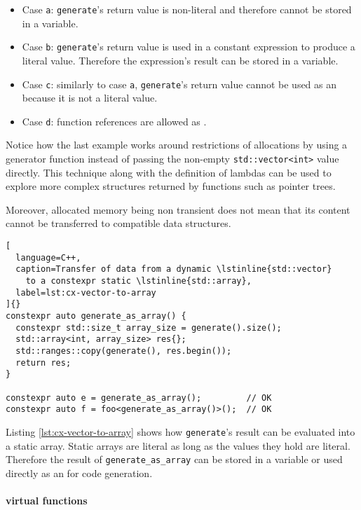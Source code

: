 \documentclass[../main]{subfiles}
\begin{document}
\begin{itemize}
\item Case \lstinline{a}: \lstinline{generate}'s return value is non-literal
      and therefore cannot be stored in a \constexpr variable.
\item Case \lstinline{b}: \lstinline{generate}'s return value is used in a
      constant expression to produce a literal value.
      Therefore the expression's result can be stored in a \constexpr variable.
\item Case \lstinline{c}: similarly to case \lstinline{a},
      \lstinline{generate}'s return value cannot be used as an \nttp because it
      is not a literal value.
\item Case \lstinline{d}: function references are allowed as \nttps.
\end{itemize}

Notice how the last example works around restrictions of \constexpr allocations
by using a generator function instead of passing the non-empty
\lstinline{std::vector<int>} value directly. This technique along with the
definition of lambdas can be used to explore more complex structures returned by
\constexpr functions such as pointer trees.

Moreover, \constexpr allocated memory being non transient does not mean that its
content cannot be transferred to \nttp compatible data structures.

\begin{lstlisting}[
  language=C++,
  caption=Transfer of data from a dynamic \lstinline{std::vector}
    to a constexpr static \lstinline{std::array},
  label=lst:cx-vector-to-array
]{}
constexpr auto generate_as_array() {
  constexpr std::size_t array_size = generate().size();
  std::array<int, array_size> res{};
  std::ranges::copy(generate(), res.begin());
  return res;
}

constexpr auto e = generate_as_array();         // OK
constexpr auto f = foo<generate_as_array()>();  // OK
\end{lstlisting}

Listing \ref{lst:cx-vector-to-array} shows how \lstinline{generate}'s result
can be evaluated into a static array. Static arrays are literal as long
as the values they hold are literal. Therefore the result of
\lstinline{generate_as_array} can be stored in a \constexpr variable or used
directly as an \nttp for code generation.

\paragraph{
  \constexpr virtual functions
}
\end{document}
